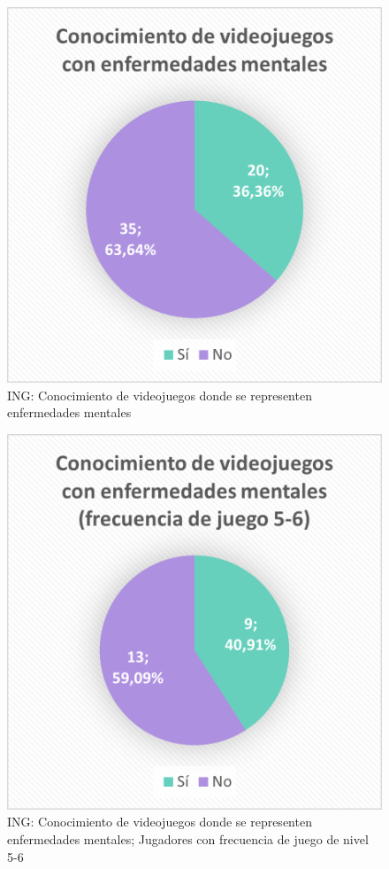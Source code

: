 \documentclass[12pt, a4paper,twoside,titlepage]{book}
\begin{document}
\begin{figure}
    \centering
    \includegraphics[width=.7\linewidth]{ANEXO ING/12AnexINGConvid}
    \caption{ING: Conocimiento de videojuegos donde se representen enfermedades mentales}
    \label{fig:INGConvid}
\end{figure}

\begin{figure}
    \centering
    \includegraphics[width=.7\linewidth]{ANEXO ING/123AnexINGConvid}
    \caption{ING: Conocimiento de videojuegos donde se representen enfermedades mentales; Jugadores con frecuencia de juego de nivel 5-6}
     \label{fig:INGConvid56}
\end{figure}
\end{document}
